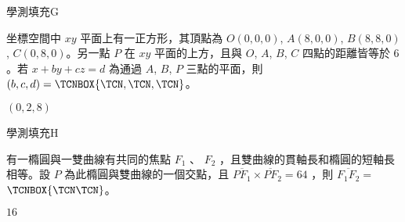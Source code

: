     \begin{QUESTION}
        \begin{ExamInfo}{98}{學測}{填充}{G}
        \end{ExamInfo}
        \begin{ExamAnsRateInfo}{36}{80}{26}{2}
        \end{ExamAnsRateInfo}
        \begin{QBODY}
            坐標空間中 $xy$ 平面上有一正方形，其頂點為 $O(0,0,0)$, $A(8,0,0)$, $B(8,8,0)$, $C(0,8,0)$。另一點 $P$ 在 $xy$ 平面的上方，且與 $O$, $A$, $B$, $C$ 四點的距離皆等於 $6$。若 $x + by + cz = d$ 為通過 $A$, $B$, $P$ 三點的平面，則 $(b,c,d)=\TCNBOX{\TCN,\TCN,\TCN}$。
        \end{QBODY}
        \begin{QFROMS}
        \end{QFROMS}
        \begin{QTAGS}\end{QTAGS}
        \begin{QANS}
            $(0,2,8)$
        \end{QANS}
        \begin{QSOLLIST}
        \end{QSOLLIST}
        \begin{QEMPTYSPACE}
        \end{QEMPTYSPACE}
    \end{QUESTION}
    \begin{QUESTION}
        \begin{ExamInfo}{98}{學測}{填充}{H}
        \end{ExamInfo}
        \begin{ExamAnsRateInfo}{36}{57}{36}{15}
        \end{ExamAnsRateInfo}
        \begin{QBODY}
            有一橢圓與一雙曲線有共同的焦點 $F_1$ 、 $F_2$ ，且雙曲線的貫軸長和橢圓的短軸長相等。設 $P$ 為此橢圓與雙曲線的一個交點，且 $\overline{PF_1} \times \overline{PF}_2 =64$ ，則 $\overline{F_1F_2} =$ 
$\TCNBOX{\TCN\TCN}$。
        \end{QBODY}
        \begin{QFROMS}
        \end{QFROMS}
        \begin{QTAGS}\end{QTAGS}
        \begin{QANS}
            $16$
        \end{QANS}
        \begin{QSOLLIST}
        \end{QSOLLIST}
        \begin{QEMPTYSPACE}
        \end{QEMPTYSPACE}
    \end{QUESTION}
